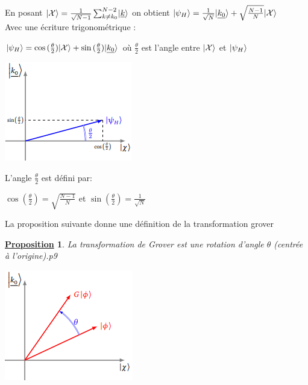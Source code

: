 \documentclass[12pt,openany]{report}
\newtheorem{proposition}{\underline{Proposition}}
\DeclarePairedDelimiter\ket{\lvert}{\rangle}
\begin{document}
En posant $\ket{\mathcal{X}}=\frac{1}{\sqrt{N-1}}  \sum_{k\neq k_0}^{N-2}\ket{\underline{k}} $ on obtient $ \ket{\psi_H}=\frac{1}{\sqrt{N}}\ket{\underline{k_0}}+\sqrt{\frac{N-1}{N}}  \ket{\mathcal{X}} $ \\
Avec une écriture trigonométrique :
\begin{center}
$ \ket{\psi_H}=\cos{(\frac{\theta}{2})} \ket{\mathcal{X}}+\sin{(\frac{\theta}{2})} \ket{\underline{k_0}} $ où $\frac{\theta}{2} $ est l'angle entre $\ket{\mathcal{X}} $ et $\ket{\psi_H}  $

\includegraphics[scale=1.2]{./angle_g}\\
\end{center}
L'angle $\frac{\theta}{2} $ est défini par: 
\begin{center}
$ \cos{(\frac{\theta}{2})}=\sqrt{\frac{N-1}{N}}$ et $\sin{(\frac{\theta}{2})}=\frac{1}{\sqrt{N}} $
\end{center}
La proposition suivante donne une définition de la transformation grover
\begin{proposition}
La transformation de Grover est une rotation d'angle $\theta $ (centrée à l'origine).\cite{Arnaud}p9
\begin{center}
\includegraphics[scale=1]{./grover_2}
\end{center}
\end{proposition}
\end{document}
